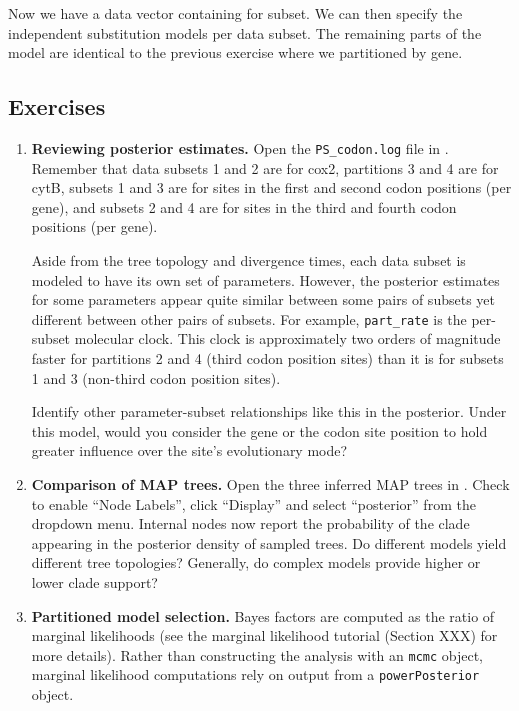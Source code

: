 Now we have a data vector containing for subset.
We can then specify the independent substitution models per data subset.
The remaining parts of the model are identical to the previous exercise where we partitioned by gene.


\subsection{Exercises}
\begin{enumerate}

\item {\bf Reviewing posterior estimates.} Open the {\tt PS\_codon.log} file in \Tracer. Remember that data subsets 1 and 2 are for cox2, partitions 3 and 4 are for cytB, subsets 1 and 3 are for sites in the first and second codon positions (per gene), and subsets 2 and 4 are for sites in the third and fourth codon positions (per gene).

Aside from the tree topology and divergence times, each data subset is modeled to have its own set of parameters.
However, the posterior estimates for some parameters appear quite similar between some pairs of subsets yet different between other pairs of subsets.
For example, {\tt part\_rate} is the per-subset molecular clock.
This clock is approximately two orders of magnitude faster for partitions 2 and 4 (third codon position sites) than it is for subsets 1 and 3 (non-third codon position sites).

Identify other parameter-subset relationships like this in the posterior.
Under this model, would you consider the gene or the codon site position to hold greater influence over the site's evolutionary mode?

\item {\bf Comparison of MAP trees.} Open the three inferred MAP trees in \FigTree.
Check to enable ``Node Labels'', click ``Display'' and select ``posterior'' from the dropdown menu.
Internal nodes now report the probability of the clade appearing in the posterior density of sampled trees.
Do different models yield different tree topologies?
Generally, do complex models provide higher or lower clade support?

\item {\bf Partitioned model selection.}
Bayes factors are computed as the ratio of marginal likelihoods (see the marginal likelihood tutorial (Section XXX) for more details).
Rather than constructing the analysis with an {\tt mcmc} object, marginal likelihood computations rely on output from a {\tt powerPosterior} object.


\end{enumerate}
